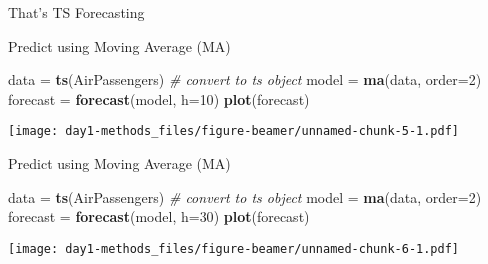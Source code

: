 \documentclass[ignorenonframetext,]{beamer}
\newenvironment{Shaded}{\begin{snugshade}}{\end{snugshade}}
\newcommand{\KeywordTok}[1]{\textcolor[rgb]{0.13,0.29,0.53}{\textbf{#1}}}
\newcommand{\DataTypeTok}[1]{\textcolor[rgb]{0.13,0.29,0.53}{#1}}
\newcommand{\DecValTok}[1]{\textcolor[rgb]{0.00,0.00,0.81}{#1}}
\newcommand{\StringTok}[1]{\textcolor[rgb]{0.31,0.60,0.02}{#1}}
\newcommand{\CommentTok}[1]{\textcolor[rgb]{0.56,0.35,0.01}{\textit{#1}}}
\newcommand{\NormalTok}[1]{#1}
\begin{document}
\begin{frame}[fragile]{That's TS Forecasting}

\begin{block}{Predict using Moving Average (MA)}

\begin{Shaded}
\begin{Highlighting}[]
\NormalTok{data =}\StringTok{ }\KeywordTok{ts}\NormalTok{(AirPassengers) }\CommentTok{# convert to ts object}
\NormalTok{model =}\StringTok{ }\KeywordTok{ma}\NormalTok{(data, }\DataTypeTok{order=}\DecValTok{2}\NormalTok{)}
\NormalTok{forecast =}\StringTok{ }\KeywordTok{forecast}\NormalTok{(model, }\DataTypeTok{h=}\DecValTok{10}\NormalTok{)}
\KeywordTok{plot}\NormalTok{(forecast)}
\end{Highlighting}
\end{Shaded}

\texttt{[image: day1-methods\_files/figure-beamer/unnamed-chunk-5-1.pdf]}

\end{block}

\begin{block}{Predict using Moving Average (MA)}

\begin{Shaded}
\begin{Highlighting}[]
\NormalTok{data =}\StringTok{ }\KeywordTok{ts}\NormalTok{(AirPassengers) }\CommentTok{# convert to ts object}
\NormalTok{model =}\StringTok{ }\KeywordTok{ma}\NormalTok{(data, }\DataTypeTok{order=}\DecValTok{2}\NormalTok{)}
\NormalTok{forecast =}\StringTok{ }\KeywordTok{forecast}\NormalTok{(model, }\DataTypeTok{h=}\DecValTok{30}\NormalTok{)}
\KeywordTok{plot}\NormalTok{(forecast)}
\end{Highlighting}
\end{Shaded}

\texttt{[image: day1-methods\_files/figure-beamer/unnamed-chunk-6-1.pdf]}

\end{block}

\end{frame}
\end{document}
